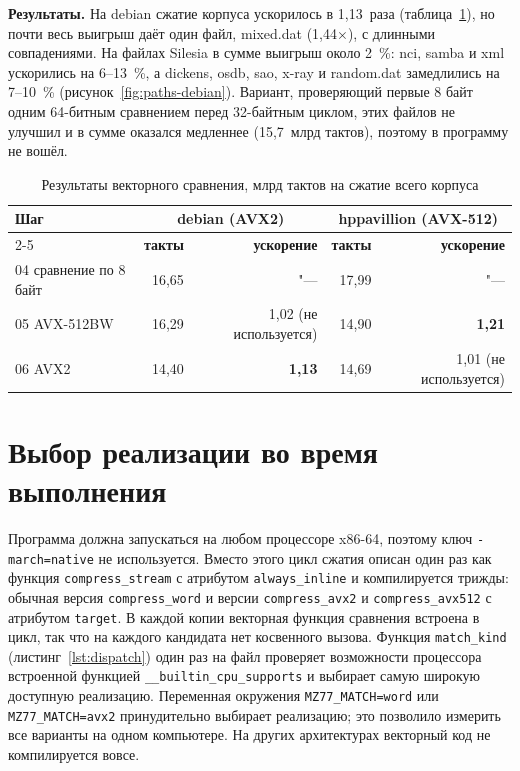 \textbf{Результаты.} На debian сжатие корпуса ускорилось в 1,13~раза
(таблица~\ref{tab:res-avx}), но почти весь выигрыш даёт один файл,
mixed.dat (1,44$\times$), с длинными совпадениями. На файлах Silesia в
сумме выигрыш около 2~\%: nci, samba и xml ускорились на 6--13~\%, а dickens,
osdb, sao, x-ray и random.dat замедлились на 7--10~\%
(рисунок~\ref{fig:paths-debian}). Вариант, проверяющий первые 8 байт
одним 64-битным сравнением перед 32-байтным циклом, этих файлов не
улучшил и в сумме оказался медленнее (15,7~млрд тактов), поэтому в
программу не вошёл.

\begin{table}[H]
\caption{Результаты векторного сравнения, млрд тактов на сжатие всего корпуса}
\label{tab:res-avx}
\begin{tabletext}
\centering
\begin{tabular}{|l|r|r|r|r|}
\hline
\multirow{2}{*}{\textbf{Шаг}} & \multicolumn{2}{c|}{\textbf{debian (AVX2)}} & \multicolumn{2}{c|}{\textbf{hppavillion (AVX-512)}} \\
\cline{2-5}
 & \textbf{такты} & \textbf{ускорение} & \textbf{такты} & \textbf{ускорение} \\
\hline
04 сравнение по 8 байт & 16,65 & "--- & 17,99 & "--- \\
05 AVX-512BW & 16,29 & 1,02 (не используется) & 14,90 & \textbf{1,21} \\
06 AVX2 & 14,40 & \textbf{1,13} & 14,69 & 1,01 (не используется) \\
\hline
\end{tabular}
\end{tabletext}
\end{table}

\section{Выбор реализации во время выполнения}
\label{sec:dispatch}

Программа должна запускаться на любом процессоре x86-64, поэтому ключ
\texttt{-march=native} не используется. Вместо этого цикл сжатия
описан один раз как функция \texttt{compress\_stream} с атрибутом
\texttt{always\_inline} и компилируется трижды: обычная версия
\texttt{compress\_word} и версии \texttt{compress\_avx2} и
\texttt{compress\_avx512} с атрибутом \texttt{target}. В каждой
копии векторная функция сравнения встроена в цикл, так что на каждого
кандидата нет косвенного вызова. Функция \texttt{match\_kind}
(листинг~\ref{lst:dispatch}) один раз на файл проверяет возможности
процессора встроенной функцией \texttt{\_\_builtin\_cpu\_supports} и
выбирает самую широкую доступную реализацию. Переменная окружения
\texttt{MZ77\_MATCH=word} или \texttt{MZ77\_MATCH=avx2} принудительно
выбирает реализацию; это позволило измерить все варианты на одном
компьютере. На других архитектурах векторный код не компилируется вовсе.

